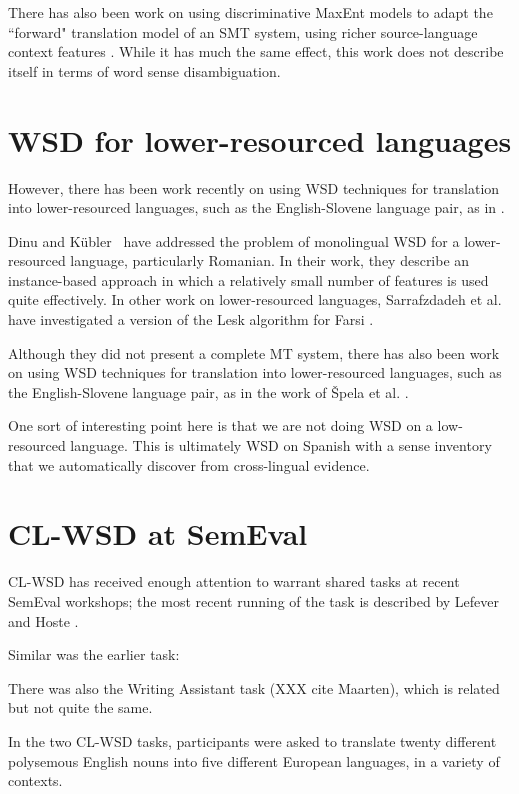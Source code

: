 There has also been work on using discriminative MaxEnt models to adapt
the ``forward" translation model of an SMT system, using richer
source-language context features \cite{vzabokrtsky-popel-marevcek:2010:WMT}.
While it has much the same effect, this work does not describe itself in terms
of word sense disambiguation.




\section{WSD for lower-resourced languages}
However, there has been work recently on using WSD techniques for translation
into lower-resourced languages, such as the English-Slovene language pair, as
in \cite{vintar-fivser-vrvsvcaj:2012:ESIRMT-HyTra2012}. 

Dinu and Kübler~\cite{Dinu07} have addressed the problem of monolingual WSD for
a lower-resourced language, particularly Romanian. In their work, they describe
an instance-based approach in which a relatively small number of features is
used quite effectively. In other work on lower-resourced languages,
Sarrafzdadeh et al. have investigated a version of the Lesk algorithm
for Farsi \cite{sarrafzdadeh}.

Although they did not present a complete MT system, there has also been work
on using WSD techniques for translation into lower-resourced languages, such as
the English-Slovene language pair, as in
the work of \v{S}pela et al.
\cite{vintar-fivser-vrvsvcaj:2012:ESIRMT-HyTra2012}. 

One sort of interesting point here is that we are not doing WSD on a
low-resourced language. This is ultimately WSD on Spanish with a sense
inventory that we automatically discover from cross-lingual evidence.


\section{CL-WSD at SemEval}
CL-WSD has received enough attention to warrant shared tasks at recent SemEval
workshops; the most recent running of the task is described by Lefever and
Hoste \cite{task10}.

Similar was the earlier task: \cite{lefever-hoste:2009:SEW}

There was also the Writing Assistant task (XXX cite Maarten), which is related
but not quite the same.

In the two CL-WSD tasks, participants were asked to translate twenty different
polysemous English nouns into five different European languages, in a variety
of contexts.

